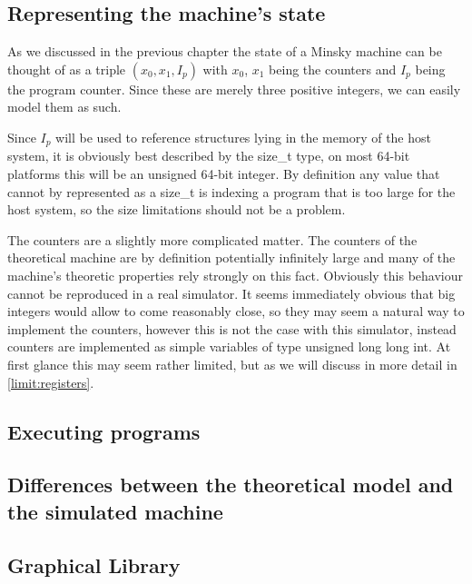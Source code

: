 \subsection{Representing the machine's state}
As we discussed in the previous chapter the state of a Minsky machine can be thought of as a triple $(x_0, x_1, I_p)$ with $x_0$, $x_1$ being the counters and $I_p$ being the program counter. Since these are merely three positive integers, we can easily model them as such.

Since $I_p$ will be used to reference structures lying in the memory of the host system, it is obviously best described by the size\_t type, on most 64-bit platforms this will be an unsigned 64-bit integer. By definition any value that cannot by represented as a size\_t is indexing a program that is too large for the host system, so the size limitations should not be a problem.

The counters are a slightly more complicated matter. The counters of the theoretical machine are by definition potentially infinitely large and many of the machine's theoretic properties rely strongly on this fact. Obviously this behaviour cannot be reproduced in a real simulator. It seems immediately obvious that big integers would allow to come reasonably close, so they may seem a natural way to implement the counters, however this is not the case with this simulator, instead counters are implemented as simple variables of type unsigned long long int. At first glance this may seem rather limited, but as we will discuss in more detail in \autoref{limit:registers}.
\subsection{Executing programs}
 
\subsection{Differences between the theoretical model and the simulated machine}
\subsection{Graphical Library}
